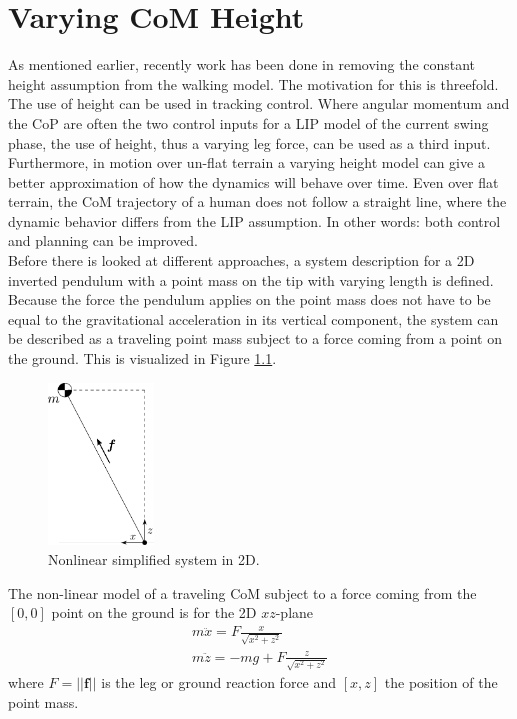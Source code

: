 %
\chapter{Varying CoM Height}%
\label{chap:varyingheight}
As mentioned earlier, recently work has been done in removing the constant height assumption from the walking model. The motivation for this is threefold. The use of height can be used in tracking control. Where angular momentum and the \ac{CoP} are often the two control inputs for a \ac{LIP} model of the current swing phase, the use of height, thus a varying leg force, can be used as a third input. Furthermore, in motion over un-flat terrain a varying height model can give a better approximation of how the dynamics will behave over time. Even over flat terrain, the \ac{CoM} trajectory of a human does not follow a straight line, where the dynamic behavior differs from the \ac{LIP} assumption. In other words: both control and planning can be improved. \\
Before there is looked at different approaches, a system description for a \ac{2D} inverted pendulum with a point mass on the tip with varying length is defined. Because the force the pendulum applies on the point mass does not have to be equal to the gravitational acceleration in its vertical component, the system can be described as a traveling point mass subject to a force coming from a point on the ground. This is visualized in Figure \ref{fig:2dnonlin}.
\begin{figure}[h]
\centering
\includegraphics[width=0.25\textwidth]{STYLESTUFF/2Dnonlin.png}
\caption{Nonlinear simplified system in \ac{2D}.}
\label{fig:2dnonlin}
\end{figure} 

The non-linear model of a traveling \ac{CoM} subject to a force coming from the $[0,0]$ point on the ground is for the \ac{2D} $xz$-plane
\begin{eqnarray}
m\ddot{x} = F \frac{x}{\sqrt{x^2+z^2}}\\
m\ddot{z} = -mg+F \frac{z}{\sqrt{x^2+z^2}}
\label{eq:nonlindyn}
\end{eqnarray} 
where $F=||\boldsymbol{f}||$ is the leg or ground reaction force and $[x,z]$ the position of the point mass.


